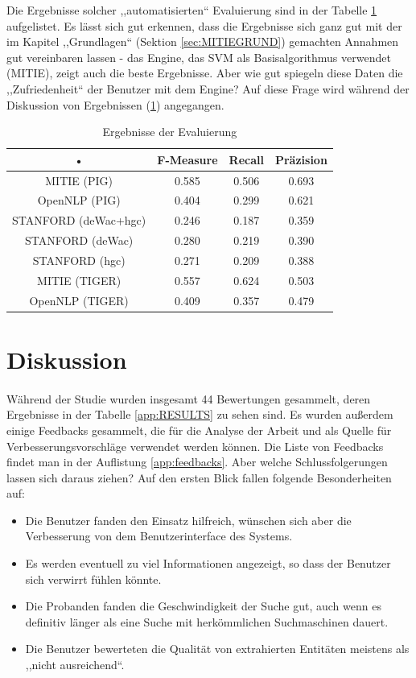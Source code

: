 Die Ergebnisse solcher ,,automatisierten`` Evaluierung sind in der Tabelle \ref{tab:AUTOEVAL} aufgelistet. Es lässt sich gut erkennen, dass die Ergebnisse sich ganz gut mit der im Kapitel ,,Grundlagen`` (Sektion \ref{sec:MITIEGRUND}) gemachten Annahmen gut vereinbaren lassen - das Engine, das SVM als Basisalgorithmus verwendet (MITIE), zeigt auch die beste Ergebnisse. Aber wie gut spiegeln diese Daten die ,,Zufriedenheit`` der Benutzer mit dem Engine? Auf diese Frage wird während der Diskussion von Ergebnissen (\ref{sec:diskussion}) angegangen.

\begin{table}
\begin{tabular}{|c|c|c|c|}
\hline 
• & F-Measure & Recall & Präzision \\ 
\hline 
MITIE (PIG) & 0.585 & 0.506 & 0.693 \\
\hline
OpenNLP (PIG) & 0.404 & 0.299 & 0.621 \\
\hline
STANFORD (deWac+hgc) & 0.246 & 0.187 & 0.359 \\
\hline
STANFORD (deWac) & 0.280 & 0.219 & 0.390 \\
\hline
STANFORD (hgc) & 0.271 & 0.209 & 0.388 \\
\hline 
MITIE (TIGER) & 0.557 & 0.624 & 0.503 \\
\hline
OpenNLP (TIGER) & 0.409 & 0.357 & 0.479 \\
\hline
\end{tabular} 
\caption{Ergebnisse der Evaluierung}
\label{tab:AUTOEVAL}
\end{table}


\section{Diskussion} \label{sec:diskussion}
\paragraph{}
Während der Studie wurden insgesamt 44 Bewertungen gesammelt, deren Ergebnisse in der Tabelle \ref{app:RESULTS} zu sehen sind. Es wurden außerdem einige Feedbacks gesammelt, die für die Analyse der Arbeit und als Quelle für Verbesserungsvorschläge verwendet werden können. Die Liste von Feedbacks findet man in der Auflistung \ref{app:feedbacks}. Aber welche Schlussfolgerungen lassen sich daraus ziehen? Auf den ersten Blick fallen folgende Besonderheiten auf:
\begin{itemize}
\item Die Benutzer fanden den Einsatz hilfreich, wünschen sich aber die Verbesserung von dem Benutzerinterface des Systems.
\item Es werden eventuell zu viel Informationen angezeigt, so dass der Benutzer sich verwirrt fühlen könnte.
\item Die Probanden fanden die Geschwindigkeit der Suche gut, auch wenn es definitiv länger als eine Suche mit herkömmlichen Suchmaschinen dauert. 
\item Die Benutzer bewerteten die Qualität von extrahierten Entitäten meistens als ,,nicht ausreichend``.
\end{itemize}

